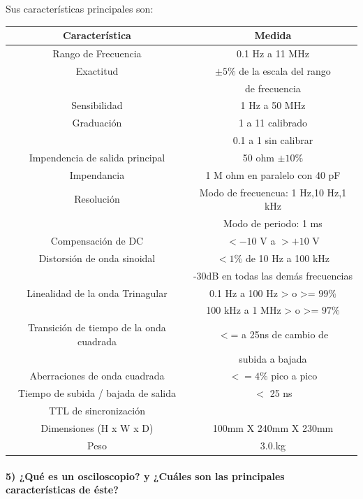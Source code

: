 \documentclass[10pt]{article}
\begin{document}
\noindent Sus características principales son:
\begin{center}
	\begin{table}[htbp]
		\centering
		\begin{tabular}{|c|c|}
			\hline
			\textbf{Característica} & 					\textbf{Medida}\\	\hline
			Rango de Frecuencia & 0.1 Hz a 11 MHz	\\	\hline
			Exactitud & $\pm 5\%$ de la escala del rango\\ & de frecuencia\\	\hline
			Sensibilidad & 1 Hz a 50 MHz\\		\hline
			Graduación & 1 a 11 calibrado \\ & 0.1 a 1 sin calibrar\\	\hline
			Impendencia de salida principal & 50 ohm $\pm 10\%$ \\	\hline
			Impendancia & 1 M ohm en paralelo con 40 pF\\ \hline
			Resolución & Modo de frecuencua: 1 Hz,10 Hz,1 kHz \\ & Modo de periodo: 1 ms\\ \hline
			Compensación de DC & $<-10$ V a $>+ 10$ V\\
			\hline
			Distorsión de onda sinoidal & $<1\%$ de 10 Hz a 100 kHz \\ & -30dB en todas las demás frecuencias\\	\hline
			Linealidad de la onda Trinagular & 0.1 Hz a 100 Hz > o >= $99\%$ \\ & 100 kHz a 1 MHz > o >= $97\%$\\ \hline
			Transición de tiempo de la onda cuadrada & $<$= a 25ns de cambio de \\ & subida a bajada\\ \hline
			Aberraciones de onda cuadrada & $<= 4\%$ pico a pico\\ \hline
			Tiempo de subida / bajada de salida & $<$ 25 ns \\ TTL de sincronización & \\ \hline
			Dimensiones (H x W x D) & 100mm X 240mm X 230mm\\	\hline
			Peso & 3.0.kg\\ \hline
		\end{tabular}
		\newline 
	\end{table}
\end{center}


\paragraph{5) ¿Qué es un osciloscopio? y ¿Cuáles son las principales características de éste?}
\end{document}
